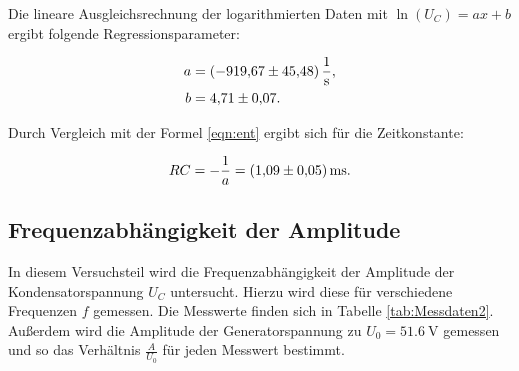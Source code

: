 Die lineare Ausgleichsrechnung der logarithmierten Daten mit $\ln{\left(U_C\right)}=ax+b$ 
ergibt folgende Regressionsparameter: 

\begin{align*}
a &= \SI{-919.67+-45.48}{\per\second},\\
b &= \num{4.71+-0.07}.
\end{align*}

Durch Vergleich mit der Formel \eqref{eqn:ent} ergibt sich für die Zeitkonstante:

\begin{equation*}
RC = -\frac{1}{a} = \SI{1.09+-0.05}{\milli\second}.
\end{equation*}

\subsection{Frequenzabhängigkeit der Amplitude}

In diesem Versuchsteil wird die Frequenzabhängigkeit der Amplitude der 
Kondensatorspannung $U_C$ untersucht. Hierzu wird diese für verschiedene 
Frequenzen $f$ gemessen. Die Messwerte finden sich in Tabelle \ref{tab:Messdaten2}.
Außerdem wird die Amplitude der Generatorspannung zu $U_0=\SI{51.6}{\volt}$ gemessen und 
so das Verhältnis $\frac{A}{U_0}$ für jeden Messwert bestimmt. 

